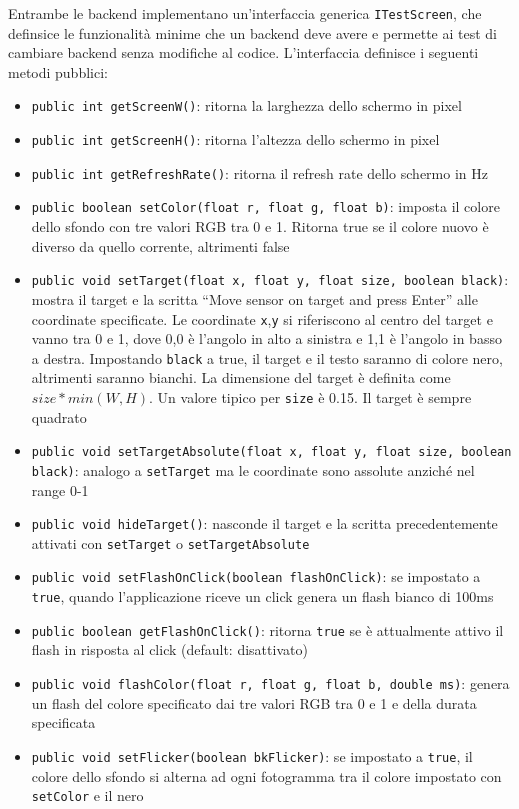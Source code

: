 Entrambe le backend implementano un'interfaccia generica \texttt{ITestScreen}, che definsice le funzionalità minime che un backend deve avere e permette ai test di cambiare backend senza modifiche al codice. L'interfaccia definisce i seguenti metodi pubblici:
\begin{itemize}
	\item \texttt{public int getScreenW()}: ritorna la larghezza dello schermo in pixel
	\item \texttt{public int getScreenH()}: ritorna l'altezza dello schermo in pixel
	\item \texttt{public int getRefreshRate()}: ritorna il refresh rate dello schermo in Hz
	\item \texttt{public boolean setColor(float r, float g, float b)}: imposta il colore dello sfondo con tre valori RGB tra 0 e 1. Ritorna true se il colore nuovo è diverso da quello corrente, altrimenti false
	\item \texttt{public void setTarget(float x, float y, float size, boolean black)}: mostra il target e la scritta ``Move sensor on target and press Enter'' alle coordinate specificate. Le coordinate \texttt{x},\texttt{y} si riferiscono al centro del target e vanno tra 0 e 1, dove 0,0 è l'angolo in alto a sinistra e 1,1 è l'angolo in basso a destra. Impostando \texttt{black} a true, il target e il testo saranno di colore nero, altrimenti saranno bianchi. La dimensione del target è definita come $size*min(W,H)$. Un valore tipico per \texttt{size} è 0.15. Il target è sempre quadrato
	\item \texttt{public void setTargetAbsolute(float x, float y, float size, boolean black)}: analogo a \texttt{setTarget} ma le coordinate sono assolute anziché nel range 0-1
	\item \texttt{public void hideTarget()}: nasconde il target e la scritta precedentemente attivati con \texttt{setTarget} o \texttt{setTargetAbsolute}
	\item \texttt{public void setFlashOnClick(boolean flashOnClick)}: se impostato a \texttt{true}, quando l'applicazione riceve un click genera un flash bianco di 100ms
	\item \texttt{public boolean getFlashOnClick()}: ritorna \texttt{true} se è attualmente attivo il flash in risposta al click (default: disattivato)
	\item \texttt{public void flashColor(float r, float g, float b, double ms)}: genera un flash del colore specificato dai tre valori RGB tra 0 e 1 e della durata specificata
	\item \texttt{public void setFlicker(boolean bkFlicker)}: se impostato a \texttt{true}, il colore dello sfondo si alterna ad ogni fotogramma tra il colore impostato con \texttt{setColor} e il nero

\end{itemize}
